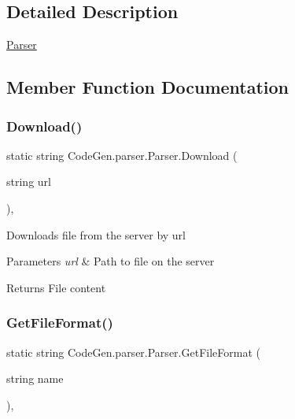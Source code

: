 \subsection{Detailed Description}
\mbox{\hyperlink{classCodeGen_1_1parser_1_1Parser}{Parser}} 



\subsection{Member Function Documentation}
\mbox{\label{classCodeGen_1_1parser_1_1Parser_aa8dc1a017c221d468885fd1ad7043de4}} 
\subsubsection{\texorpdfstring{Download()}{Download()}}
{\footnotesize\ttfamily static string Code\+Gen.\+parser.\+Parser.\+Download (\begin{DoxyParamCaption}\item[{string}]{url }\end{DoxyParamCaption})\hspace{0.3cm}{\ttfamily [inline]}, {\ttfamily [static]}}



Downloads file from the server by url 


\begin{DoxyParams}{Parameters}
{\em url} & Path to file on the server\\
\hline
\end{DoxyParams}
\begin{DoxyReturn}{Returns}
File content
\end{DoxyReturn}
\mbox{\label{classCodeGen_1_1parser_1_1Parser_a3297d7993fc6c739b3ff74f469c0589a}} 
\subsubsection{\texorpdfstring{Get\+File\+Format()}{GetFileFormat()}}
{\footnotesize\ttfamily static string Code\+Gen.\+parser.\+Parser.\+Get\+File\+Format (\begin{DoxyParamCaption}\item[{string}]{name }\end{DoxyParamCaption})\hspace{0.3cm}{\ttfamily [inline]}, {\ttfamily [static]}}



